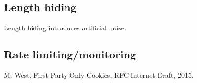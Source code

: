 \documentclass[a4paper, 11 pt, conference]{article}
\begin{document}
\subsection{Length hiding}\label{subsec:noise}
Length hiding introduces artificial noise.

\subsection{Rate limiting/monitoring}\label{subsec:monitoring}

\begin{thebibliography}{1}

 M. West, First-Party-Only Cookies, RFC Internet-Draft, 2015.

\end{thebibliography}
\end{document}
